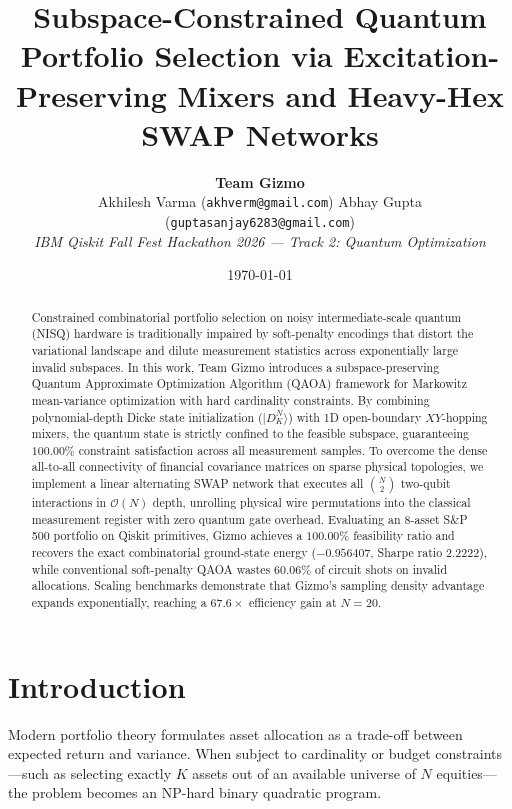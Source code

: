 \documentclass[10pt,twocolumn]{article}
\title{\textbf{Subspace-Constrained Quantum Portfolio Selection via Excitation-Preserving Mixers and Heavy-Hex SWAP Networks}}
\author{
    \textbf{Team Gizmo} \\
    Akhilesh Varma (\texttt{akhverm@gmail.com}) \quad Abhay Gupta (\texttt{guptasanjay6283@gmail.com}) \\
    \textit{IBM Qiskit Fall Fest Hackathon 2026 --- Track 2: Quantum Optimization}
}
\date{\today}
\begin{document}
\maketitle

\begin{abstract}
Constrained combinatorial portfolio selection on noisy intermediate-scale quantum (NISQ) hardware is traditionally impaired by soft-penalty encodings that distort the variational landscape and dilute measurement statistics across exponentially large invalid subspaces. In this work, Team Gizmo introduces a subspace-preserving Quantum Approximate Optimization Algorithm (QAOA) framework for Markowitz mean-variance optimization with hard cardinality constraints. By combining polynomial-depth Dicke state initialization ($|D_K^N\rangle$) with 1D open-boundary $XY$-hopping mixers, the quantum state is strictly confined to the feasible subspace, guaranteeing $100.00\%$ constraint satisfaction across all measurement samples. To overcome the dense all-to-all connectivity of financial covariance matrices on sparse physical topologies, we implement a linear alternating SWAP network that executes all $\binom{N}{2}$ two-qubit interactions in $\mathcal{O}(N)$ depth, unrolling physical wire permutations into the classical measurement register with zero quantum gate overhead. Evaluating an 8-asset S\&P 500 portfolio on Qiskit primitives, Gizmo achieves a $100.00\%$ feasibility ratio and recovers the exact combinatorial ground-state energy ($-0.956407$, Sharpe ratio $2.2222$), while conventional soft-penalty QAOA wastes $60.06\%$ of circuit shots on invalid allocations. Scaling benchmarks demonstrate that Gizmo's sampling density advantage expands exponentially, reaching a $67.6\times$ efficiency gain at $N=20$.
\end{abstract}

\section{Introduction}
Modern portfolio theory \cite{markowitz1952} formulates asset allocation as a trade-off between expected return and variance. When subject to cardinality or budget constraints---such as selecting exactly $K$ assets out of an available universe of $N$ equities---the problem becomes an NP-hard binary quadratic program.
\end{document}
